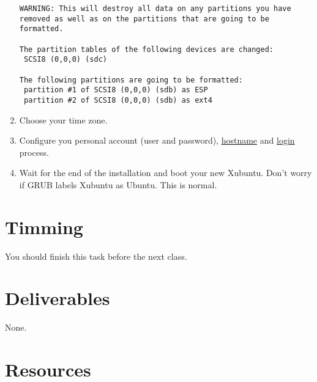 \begin{enumerate}
\begin{verbatim}
WARNING: This will destroy all data on any partitions you have removed as well as on the partitions that are going to be formatted.

The partition tables of the following devices are changed:
 SCSI8 (0,0,0) (sdc)

The following partitions are going to be formatted:
 partition #1 of SCSI8 (0,0,0) (sdb) as ESP
 partition #2 of SCSI8 (0,0,0) (sdb) as ext4
\end{verbatim}

\item Choose your time zone.
  
\item Configure you personal account (user and password),
  \href{https://en.wikipedia.org/wiki/Hostname}{hostname} and
  \href{https://en.wikipedia.org/wiki/Login}{login} process.
  
\item Wait for the end of the installation and boot your new
  Xubuntu. Don't worry if GRUB labels Xubuntu as Ubuntu. This is
  normal.
  
\end{enumerate}

\section{Timming}

You should finish this task before the next class.

\section{Deliverables}

None.

\section{Resources}

\renewcommand{\addcontentsline}[3]{}%

